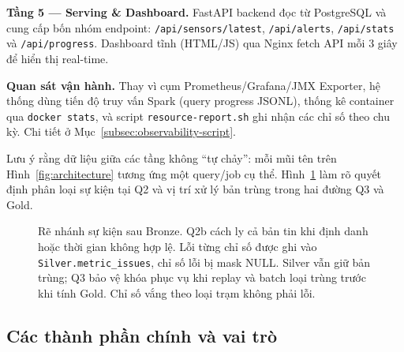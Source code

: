 \textbf{Tầng 5 --- Serving \& Dashboard.} FastAPI backend đọc từ PostgreSQL
và cung cấp bốn nhóm endpoint: \texttt{/api/sensors/latest},
\texttt{/api/alerts}, \texttt{/api/stats} và \texttt{/api/progress}.
Dashboard tĩnh (HTML/JS) qua Nginx
fetch API mỗi 3 giây để hiển thị real-time.

\textbf{Quan sát vận hành.} Thay vì cụm Prometheus/Grafana/JMX Exporter, hệ
thống dùng tiến độ truy vấn Spark (query progress JSONL), thống kê container
qua \texttt{docker stats}, và script \texttt{resource-report.sh} ghi nhận các
chỉ số theo chu kỳ. Chi tiết ở Mục~\ref{subsec:observability-script}.

Lưu ý rằng dữ liệu giữa các tầng không ``tự chảy'': mỗi mũi tên trên
Hình~\ref{fig:architecture} tương ứng một query/job cụ thể.
Hình~\ref{fig:event-flow} làm rõ quyết định phân loại sự kiện tại Q2 và
vị trí xử lý bản trùng trong hai đường Q3 và Gold.

\begin{figure}[H]
\centering

\caption[Rẽ nhánh sự kiện tại Q2 và phạm vi xử lý bản trùng.]{Rẽ nhánh sự kiện
sau Bronze. Q2b cách ly cả bản tin khi định danh hoặc thời gian không hợp lệ.
Lỗi từng chỉ số được ghi vào \texttt{Silver.metric\_issues}, chỉ số lỗi bị
mask NULL. Silver vẫn giữ bản trùng; Q3 bảo vệ khóa phục vụ khi replay và batch
loại trùng trước khi tính Gold. Chỉ số vắng theo loại trạm không phải lỗi.}
\label{fig:event-flow}
\end{figure}

\subsection{Các thành phần chính và vai trò}

